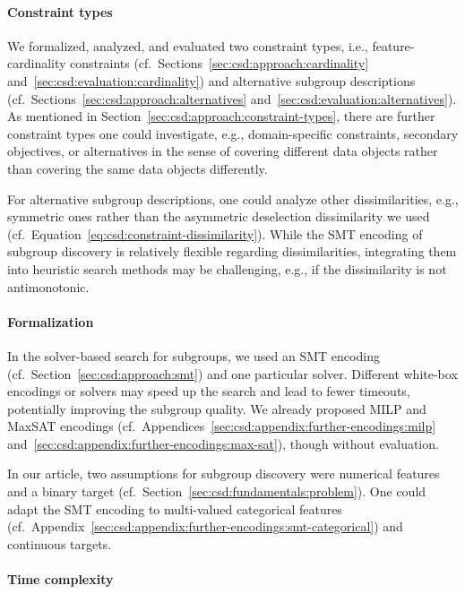\documentclass{article}
\theoremstyle{definition}
\begin{document}
\paragraph{Constraint types}

We formalized, analyzed, and evaluated two constraint types, i.e., feature-cardinality constraints (cf.~Sections~\ref{sec:csd:approach:cardinality} and~\ref{sec:csd:evaluation:cardinality}) and alternative subgroup descriptions (cf.~Sections~\ref{sec:csd:approach:alternatives} and~\ref{sec:csd:evaluation:alternatives}).
As mentioned in Section~\ref{sec:csd:approach:constraint-types}, there are further constraint types one could investigate, e.g., domain-specific constraints, secondary objectives, or alternatives in the sense of covering different data objects rather than covering the same data objects differently.

For alternative subgroup descriptions, one could analyze other dissimilarities, e.g., symmetric ones rather than the asymmetric deselection dissimilarity we used (cf.~Equation~\ref{eq:csd:constraint-dissimilarity}).
While the SMT encoding of subgroup discovery is relatively flexible regarding dissimilarities, integrating them into heuristic search methods may be challenging, e.g., if the dissimilarity is not antimonotonic.

\paragraph{Formalization}

In the solver-based search for subgroups, we used an SMT encoding (cf.~Section~\ref{sec:csd:approach:smt}) and one particular solver.
Different white-box encodings or solvers may speed up the search and lead to fewer timeouts, potentially improving the subgroup quality.
We already proposed MILP and MaxSAT encodings (cf.~Appendices~\ref{sec:csd:appendix:further-encodings:milp} and~\ref{sec:csd:appendix:further-encodings:max-sat}), though without evaluation.

In our article, two assumptions for subgroup discovery were numerical features and a binary target (cf.~Section~\ref{sec:csd:fundamentals:problem}).
One could adapt the SMT encoding to multi-valued categorical features (cf.~Appendix~\ref{sec:csd:appendix:further-encodings:smt-categorical}) and continuous targets.

\paragraph{Time complexity}
\end{document}
